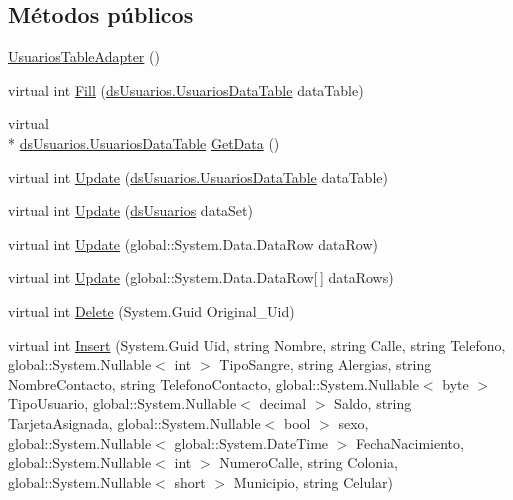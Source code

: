 \subsection*{Métodos públicos}
\begin{DoxyCompactItemize}
\item 
\hyperlink{class_proyecto___integrador__3_1_1ds_usuarios_table_adapters_1_1_usuarios_table_adapter_a797ab917f7e82755f62fe9d0d79070d5}{Usuarios\-Table\-Adapter} ()
\item 
virtual int \hyperlink{class_proyecto___integrador__3_1_1ds_usuarios_table_adapters_1_1_usuarios_table_adapter_af746bdf2da4d481ea55a5042b1622853}{Fill} (\hyperlink{class_proyecto___integrador__3_1_1ds_usuarios_1_1_usuarios_data_table}{ds\-Usuarios.\-Usuarios\-Data\-Table} data\-Table)
\item 
virtual \\*
\hyperlink{class_proyecto___integrador__3_1_1ds_usuarios_1_1_usuarios_data_table}{ds\-Usuarios.\-Usuarios\-Data\-Table} \hyperlink{class_proyecto___integrador__3_1_1ds_usuarios_table_adapters_1_1_usuarios_table_adapter_afd320186ece4a3b67316cc51110f64b3}{Get\-Data} ()
\item 
virtual int \hyperlink{class_proyecto___integrador__3_1_1ds_usuarios_table_adapters_1_1_usuarios_table_adapter_a0cb310a6346b919a7ac5717ea3225d0b}{Update} (\hyperlink{class_proyecto___integrador__3_1_1ds_usuarios_1_1_usuarios_data_table}{ds\-Usuarios.\-Usuarios\-Data\-Table} data\-Table)
\item 
virtual int \hyperlink{class_proyecto___integrador__3_1_1ds_usuarios_table_adapters_1_1_usuarios_table_adapter_a17c57c49d7bda936d56a1259a81fc469}{Update} (\hyperlink{class_proyecto___integrador__3_1_1ds_usuarios}{ds\-Usuarios} data\-Set)
\item 
virtual int \hyperlink{class_proyecto___integrador__3_1_1ds_usuarios_table_adapters_1_1_usuarios_table_adapter_a1d5bcbd23ee368dbf8ad7e26afbbf863}{Update} (global\-::\-System.\-Data.\-Data\-Row data\-Row)
\item 
virtual int \hyperlink{class_proyecto___integrador__3_1_1ds_usuarios_table_adapters_1_1_usuarios_table_adapter_ab5b846871861d3074de589dcfc12c6c7}{Update} (global\-::\-System.\-Data.\-Data\-Row\mbox{[}$\,$\mbox{]} data\-Rows)
\item 
virtual int \hyperlink{class_proyecto___integrador__3_1_1ds_usuarios_table_adapters_1_1_usuarios_table_adapter_aeeaf19cd15c750f670fe1ba2584693de}{Delete} (System.\-Guid Original\-\_\-\-Uid)
\item 
virtual int \hyperlink{class_proyecto___integrador__3_1_1ds_usuarios_table_adapters_1_1_usuarios_table_adapter_afe0ac5364d4900a3029e182186300cdf}{Insert} (System.\-Guid Uid, string Nombre, string Calle, string Telefono, global\-::\-System.\-Nullable$<$ int $>$ Tipo\-Sangre, string Alergias, string Nombre\-Contacto, string Telefono\-Contacto, global\-::\-System.\-Nullable$<$ byte $>$ Tipo\-Usuario, global\-::\-System.\-Nullable$<$ decimal $>$ Saldo, string Tarjeta\-Asignada, global\-::\-System.\-Nullable$<$ bool $>$ sexo, global\-::\-System.\-Nullable$<$ global\-::\-System.\-Date\-Time $>$ Fecha\-Nacimiento, global\-::\-System.\-Nullable$<$ int $>$ Numero\-Calle, string Colonia, global\-::\-System.\-Nullable$<$ short $>$ Municipio, string Celular)

\end{DoxyCompactItemize}
